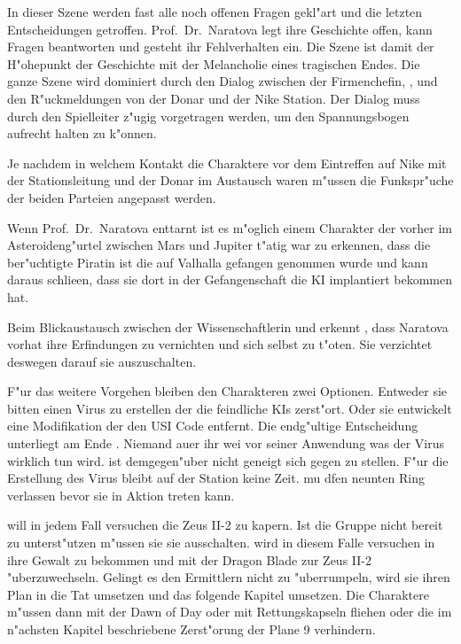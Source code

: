 \begin{remarks}
	In dieser Szene werden fast alle noch offenen Fragen gekl"art und die letzten Entscheidungen getroffen. Prof.~Dr.~Naratova legt ihre Geschichte offen, kann Fragen beantworten und gesteht ihr Fehlverhalten ein. Die Szene ist damit der H"ohepunkt der Geschichte mit der Melancholie eines tragischen Endes. Die ganze Szene wird dominiert durch den Dialog zwischen der Firmenchefin, \xl{}, \ml{} und den R"uckmeldungen von der Donar und der Nike Station. Der Dialog muss durch den Spielleiter z"ugig vorgetragen werden, um den Spannungsbogen aufrecht halten zu k"onnen.

	Je nachdem in welchem Kontakt die Charaktere vor dem Eintreffen auf Nike mit der Stationsleitung und der Donar im Austausch waren m"ussen die Funkspr"uche der beiden Parteien angepasst werden.

	Wenn Prof.~Dr.~Naratova \xl{} enttarnt ist es m"oglich einem Charakter der vorher im Asteroideng"urtel zwischen Mars und Jupiter t"atig war zu erkennen, dass \xl{} die ber"uchtigte Piratin ist die auf Valhalla gefangen genommen wurde und kann daraus schlie\3en, dass sie dort in der Gefangenschaft die KI implantiert bekommen hat.

	Beim Blickaustausch zwischen der Wissenschaftlerin und \xl{} erkennt \xl{}, dass Naratova vorhat ihre Erfindungen zu vernichten und sich selbst zu t"oten. Sie verzichtet deswegen darauf sie auszuschalten.

	F"ur das weitere Vorgehen bleiben den Charakteren zwei Optionen. Entweder sie bitten \ml{} einen Virus zu erstellen der die feindliche KIs zerst"ort. Oder sie entwickelt eine Modifikation der den USI Code entfernt. Die endg"ultige Entscheidung unterliegt am Ende \ml{}. Niemand au\3er ihr wei\3 vor seiner Anwendung was der Virus wirklich tun wird. \ml{} ist  demgegen"uber nicht geneigt sich gegen \xl{} zu stellen. F"ur die Erstellung des Virus bleibt auf der Station keine Zeit. \ml{} mu\3 dfen neunten Ring verlassen bevor sie in Aktion treten kann.
	
	\xl{} will in jedem Fall versuchen die Zeus II-2 zu kapern. Ist die Gruppe nicht bereit \xl{} zu unterst"utzen m"ussen sie sie ausschalten. \xl{} wird in diesem Falle versuchen \ml{} in ihre Gewalt zu bekommen und mit der Dragon Blade zur Zeus II-2 "uberzuwechseln. Gelingt es den Ermittlern nicht \xl{} zu "uberrumpeln, wird sie ihren Plan in die Tat umsetzen und das folgende Kapitel umsetzen. Die Charaktere m"ussen dann mit der Dawn of Day oder mit Rettungskapseln fliehen oder die im n"achsten Kapitel beschriebene Zerst"orung der Plane 9 verhindern.
\end{remarks}
